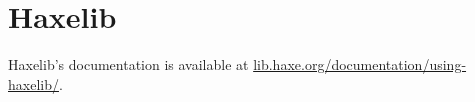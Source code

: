 \chapter{Haxelib}
\label{haxelib}

Haxelib's documentation is available at \href{https://lib.haxe.org/documentation/using-haxelib/}{lib.haxe.org/documentation/using-haxelib/}.
